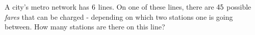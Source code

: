 
%
%
%
%      
% 
% 
%   



\gcalcexpr[0]

\question A city's metro network has $6$ lines. On one of these lines, there are $45$ 
possible \textit{fares} that can be charged - depending on which two stations one is going between.
 How many stations are there on this line? 

